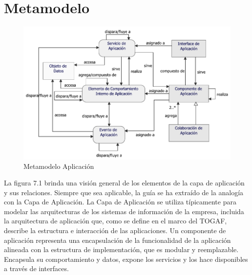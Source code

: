 \section{Metamodelo}
\begin{figure}[h!]
	\centering
	\includegraphics[width=0.9\linewidth]{imgs/meta/Aplicacion}
	\caption{Metamodelo Aplicación}
\end{figure}

La figura 7.1 brinda una visión general de los elementos de la capa de aplicación y sus relaciones. Siempre que sea aplicable, la guía se ha extraído de la analogía con la Capa de Aplicación. La Capa de Aplicación se utiliza típicamente para modelar las arquitecturas de los sistemas de información de la empresa, incluida la arquitectura de aplicación que, como se define en el marco del TOGAF, describe la estructura e interacción de las aplicaciones. Un componente de aplicación representa una encapsulación de la funcionalidad de la aplicación alineada con la estructura de implementación, que es modular y reemplazable. Encapsula su comportamiento y datos, expone los servicios y los hace disponibles a través de interfaces.

\newpage


\newpage


\newpage


\newpage
